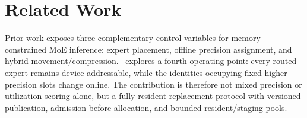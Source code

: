 \section{Related Work}

Prior work exposes three complementary control variables for memory-constrained MoE inference: expert placement, offline precision assignment, and hybrid movement/compression. \systemname\ explores a fourth operating point: every routed expert remains device-addressable, while the identities occupying fixed higher-precision slots change online. The contribution is therefore not mixed precision or utilization scoring alone, but a fully resident replacement protocol with versioned publication, admission-before-allocation, and bounded resident/staging pools.

\begin{table}[!h]
\centering
\caption{Mechanism boundary relative to representative baselines. A routed cache miss may require host-to-device transfer even when prefetch hides some or all of its latency.}
\label{tab:mechanism_boundary}
\vspace{-0.4em}
\scriptsize
\setlength{\tabcolsep}{2.2pt}
\end{table}

